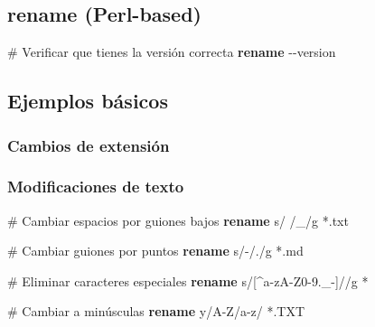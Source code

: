 \documentclass[
  11pt,
  letterpaper,
  oneside,
  openany]{scrbook}
\newenvironment{Shaded}{}{}
\newcommand{\AttributeTok}[1]{\textcolor[rgb]{0.84,0.23,0.29}{#1}}
\newcommand{\CommentTok}[1]{\textcolor[rgb]{0.42,0.45,0.49}{#1}}
\newcommand{\ExtensionTok}[1]{\textcolor[rgb]{0.84,0.23,0.29}{\textbf{#1}}}
\newcommand{\NormalTok}[1]{\textcolor[rgb]{0.14,0.16,0.18}{#1}}
\newcommand{\PreprocessorTok}[1]{\textcolor[rgb]{0.84,0.23,0.29}{#1}}
\newcommand{\StringTok}[1]{\textcolor[rgb]{0.01,0.18,0.38}{#1}}
\begin{document}
\subsection{rename (Perl-based)}\label{rename-perl-based}

\begin{Shaded}
\begin{Highlighting}[]
\CommentTok{\# Verificar que tienes la versión correcta}
\ExtensionTok{rename} \AttributeTok{{-}{-}version}
\end{Highlighting}
\end{Shaded}

\subsection{Ejemplos básicos}\label{ejemplos-buxe1sicos}

\subsubsection{Cambios de extensión}\label{cambios-de-extensiuxf3n}

\begin{Shaded}
\end{Shaded}

\subsubsection{Modificaciones de texto}\label{modificaciones-de-texto}

\begin{Shaded}
\begin{Highlighting}[]
\CommentTok{\# Cambiar espacios por guiones bajos}
\ExtensionTok{rename} \StringTok{\textquotesingle{}s/ /\_/g\textquotesingle{}} \PreprocessorTok{*}\NormalTok{.txt}

\CommentTok{\# Cambiar guiones por puntos}
\ExtensionTok{rename} \StringTok{\textquotesingle{}s/{-}/./g\textquotesingle{}} \PreprocessorTok{*}\NormalTok{.md}

\CommentTok{\# Eliminar caracteres especiales}
\ExtensionTok{rename} \StringTok{\textquotesingle{}s/[\^{}a{-}zA{-}Z0{-}9.\_{-}]//g\textquotesingle{}} \PreprocessorTok{*}

\CommentTok{\# Cambiar a minúsculas}
\ExtensionTok{rename} \StringTok{\textquotesingle{}y/A{-}Z/a{-}z/\textquotesingle{}} \PreprocessorTok{*}\NormalTok{.TXT}
\end{Highlighting}
\end{Shaded}
\end{document}
